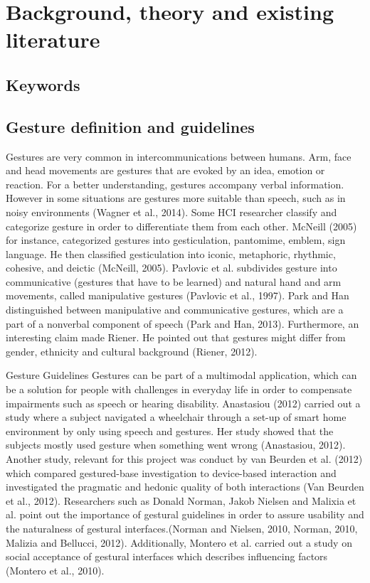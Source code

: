 \chapter{Background, theory and existing literature}
\label{chap:background}


\section{Keywords}
\label{sec:keywords}

\section{Gesture definition and guidelines}
\label{sec:gesture}
Gestures are very common in intercommunications between humans. Arm, face and head movements are gestures that are evoked by an idea, emotion or reaction. For a better understanding, gestures accompany verbal information. However in some situations are gestures more suitable than speech, such as in noisy environments (Wagner et al., 2014).
Some HCI researcher classify and categorize gesture in order to differentiate them from each other. McNeill (2005) for instance, categorized gestures into gesticulation, pantomime, emblem, sign language. He then classified gesticulation into iconic, metaphoric, rhythmic, cohesive, and deictic (McNeill, 2005). Pavlovic et al. subdivides gesture into communicative (gestures that have to be learned) and natural hand and arm movements, called manipulative gestures (Pavlovic et al., 1997). Park and Han distinguished between manipulative and communicative gestures, which are a part of a nonverbal component of speech (Park and Han, 2013). Furthermore, an interesting claim made Riener. He pointed out that gestures might differ from gender, ethnicity and cultural background (Riener, 2012).
 
Gesture Guidelines
Gestures can be part of a multimodal application, which can be a solution for people with challenges in everyday life in order to compensate impairments such as speech or hearing disability. Anastasiou (2012) carried out a study where a subject navigated a wheelchair through a set-up of smart home environment by only using speech and gestures. Her study showed that the subjects mostly used gesture when something went wrong (Anastasiou, 2012). Another study, relevant for this project was conduct by van Beurden et al. (2012) which compared gestured-base investigation to device-based interaction  and investigated the pragmatic and hedonic quality of both interactions (Van Beurden et al., 2012). Researchers such as Donald Norman, Jakob Nielsen and Malixia et al. point out the importance of gestural guidelines in order to assure usability and the naturalness of gestural interfaces.(Norman and Nielsen, 2010, Norman, 2010, Malizia and Bellucci, 2012). Additionally, Montero et al. carried out a study on social acceptance of gestural interfaces which describes influencing factors (Montero et al., 2010).



